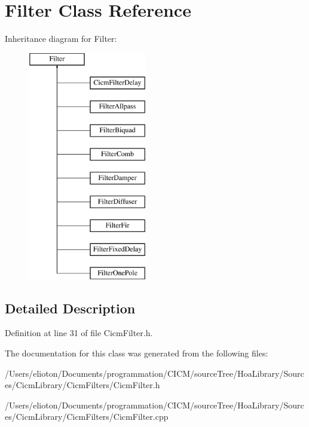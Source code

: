 \hypertarget{class_filter}{\section{Filter Class Reference}
\label{class_filter}
}
Inheritance diagram for Filter\-:\begin{figure}[H]
\begin{center}
\leavevmode
\includegraphics[height=10.000000cm]{class_filter}
\end{center}
\end{figure}


\subsection{Detailed Description}


Definition at line 31 of file Cicm\-Filter.\-h.



The documentation for this class was generated from the following files\-:\begin{DoxyCompactItemize}
\item 
/\-Users/elioton/\-Documents/programmation/\-C\-I\-C\-M/source\-Tree/\-Hoa\-Library/\-Sources/\-Cicm\-Library/\-Cicm\-Filters/Cicm\-Filter.\-h\item 
/\-Users/elioton/\-Documents/programmation/\-C\-I\-C\-M/source\-Tree/\-Hoa\-Library/\-Sources/\-Cicm\-Library/\-Cicm\-Filters/Cicm\-Filter.\-cpp\end{DoxyCompactItemize}
